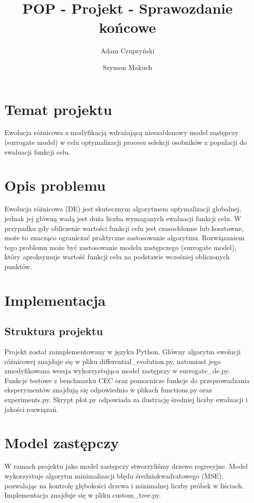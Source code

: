 \documentclass{article}
\title{POP - Projekt - Sprawozdanie końcowe}
\author{Adam Czupryński \and Szymon Makuch}
\begin{document}
\maketitle

\section{Temat projektu}
Ewolucja różnicowa z modyfikacją wdrażającą nieszablonowy model zastępczy (surrogate model) w celu optymalizacji procesu selekcji osobników z populacji do ewaluacji funkcji celu.

\section{Opis problemu}
Ewolucja różnicowa (DE) jest skutecznym algorytmem optymalizacji globalnej, jednak jej główną wadą jest duża liczba wymaganych ewaluacji funkcji celu. W przypadku gdy obliczenie wartości funkcji celu jest czasochłonne lub kosztowne, może to znacząco ograniczać praktyczne zastosowanie algorytmu. Rozwiązaniem tego problemu może być zastosowanie modelu zastępczego (surrogate model), który aproksymuje wartość funkcji celu na podstawie wcześniej obliczonych punktów.

\section{Implementacja}
\subsection{Struktura projektu}
Projekt został zaimplementowany w języku Python. Główny algorytm ewolucji różnicowej znajduje się w pliku differential\_evolution.py, natomiast jego zmodyfikowana wersja wykorzystująca model zastępczy w surrogate\_de.py. Funkcje testowe z benchmarku CEC oraz pomocnicze funkcje do przeprowadzania eksperymentów znajdują się odpowiednio w plikach functions.py oraz experiments.py. Skrypt plot.py odpowiada za ilustrację średniej liczby ewaluacji i jakości rozwiązań. 

\section{Model zastępczy}
W ramach projektu jako model zastępczy stworzyliśmy drzewo regresyjne. Model wykorzystuje algorytm minimalizacji błędu średniokwadratowego (MSE), pozwalając na kontrolę głębokości drzewa i minimalnej liczby próbek w liściach. Implementacja znajduje się w pliku custom\_tree.py.
\end{document}
